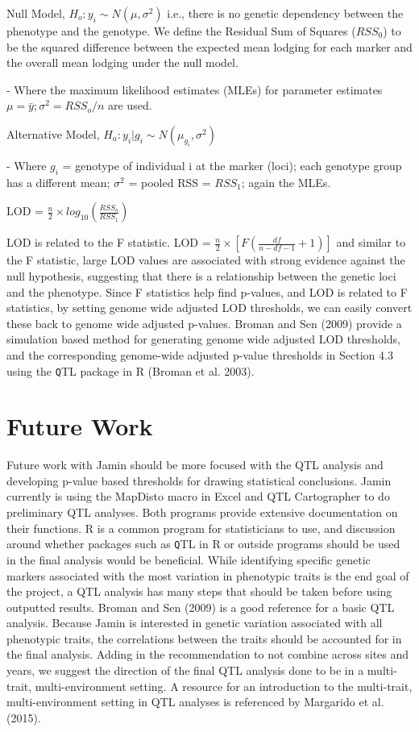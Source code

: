\documentclass[11pt]{article}\usepackage[]{graphicx}\usepackage[]{color}
\begin{document}
Null Model, $H_{o}: y_{i} \sim N(\mu, \sigma^2)$ i.e., there is no genetic dependency between the phenotype and the genotype. We define the Residual Sum of Squares ($RSS_{0}$) to be the squared difference between the expected mean lodging for each marker and the overall mean lodging under the null model. 

- Where the maximum likelihood estimates (MLEs) for parameter estimates $\mu = \bar{y}; \sigma^2 = RSS_{o}/n$ are used.

Alternative Model, $H_{a}: y_{i}|g_{i} \sim N(\mu_{g_{i}}, \sigma^2)$

- Where $g_{i}$ = genotype of individual i at the marker (loci); each genotype group has a different mean; $\sigma^2$ = pooled RSS = $RSS_{1}$; again the MLEs. 

LOD = $\frac{n}{2} \times log_{10}(\frac{RSS_{o}}{RSS_{1}})$

LOD is related to the F statistic. LOD = $\frac{n}{2} \times [F(\frac{df}{n-df-1} + 1)]$ and similar to the F statistic, large LOD values are associated with strong evidence against the null hypothesis, suggesting that there is a relationship between the genetic loci and the phenotype. Since F statistics help find p-values, and LOD is related to F statistics, by setting genome wide adjusted LOD thresholds, we can easily convert these back to genome wide adjusted p-values. Broman and Sen (2009) provide a simulation based method for generating genome wide adjusted LOD thresholds, and the corresponding genome-wide adjusted p-value thresholds in Section 4.3 using the {\texttt QTL} package in R (Broman et al. 2003). 

\section{Future Work}

Future work with Jamin should be more focused with the QTL analysis and developing p-value based thresholds for drawing statistical conclusions. Jamin currently is using the MapDisto macro in Excel and QTL Cartographer to do preliminary QTL analyses. Both programs provide extensive documentation on their functions. R is a common program for statisticians to use, and discussion around whether packages such as {\texttt QTL} in R or outside programs should be used in the final analysis would be beneficial. While identifying specific genetic markers associated with the most variation in phenotypic traits is the end goal of the project, a QTL analysis has many steps that should be taken before using outputted results. Broman and Sen (2009) is a good reference for a basic QTL analysis. Because Jamin is interested in genetic variation associated with all phenotypic traits, the correlations between the traits should be accounted for in the final analysis. Adding in the recommendation to not combine across sites and years, we suggest the direction of the final QTL analysis done to be in a multi-trait, multi-environment setting. A resource for an introduction to the multi-trait, multi-environment setting in QTL analyses is referenced by Margarido et al. (2015).
\end{document}
